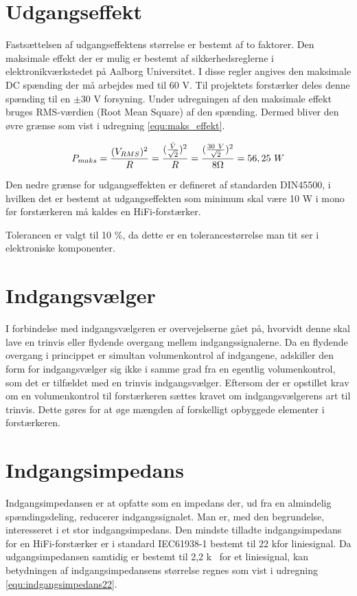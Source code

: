 \section{Udgangseffekt}
\label{krav_udgangseffekt}
Fastsættelsen af udgangseffektens størrelse er bestemt af to faktorer. Den maksimale effekt der er mulig er bestemt af sikkerhedsreglerne i elektronikværkstedet på Aalborg Universitet. I disse regler angives den maksimale DC spænding der må arbejdes med til 60 V. Til projektets forstærker deles denne spænding til en $\pm$30 V forsyning. Under udregningen af den maksimale effekt bruges RMS-værdien (Root Mean Square) af den spænding. Dermed bliver den øvre grænse som vist i udregning \ref{equ:maks_effekt}.

\begin{equation}
\label{equ:maks_effekt}
P_{maks} = \frac{(V_{RMS})^2}{R}= \frac{(\frac{\hat{V}}{\sqrt{2}})^2}{R} = \frac{(\frac{30~V}{\sqrt{2}})^2}{8\ohm} = 56,25~W
\end{equation}

Den nedre grænse for udgangseffekten er defineret af standarden DIN45500, i hvilken det er bestemt at udgangseffekten som minimum skal være 10 W i mono før forstærkeren må kaldes en HiFi-forstærker.

Tolerancen er valgt til 10 \%, da dette er en tolerancestørrelse man tit ser i elektroniske komponenter.

\section{Indgangsvælger}
\label{krav_indgangsvaelger}
I forbindelse med indgangsvælgeren er overvejelserne gået på, hvorvidt denne skal lave en trinvis eller flydende overgang mellem indgangssignalerne. Da en flydende overgang i princippet er simultan volumenkontrol af indgangene, adskiller den form for indgangsvælger sig ikke i samme grad fra en egentlig volumenkontrol, som det er tilfældet med en trinvis indgangsvælger. Eftersom der er opstillet krav om en volumenkontrol til forstærkeren sættes kravet om indgangsvælgerens art til trinvis. Dette gøres for at øge mængden af forskelligt opbyggede elementer i forstærkeren. 

\section{Indgangsimpedans}
\label{krav_indgangsimpedans}
Indgangsimpedansen er at opfatte som en impedans der, ud fra en almindelig spændingsdeling, reducerer indgangssignalet. Man er, med den begrundelse, interesseret i et stor indgangsimpedans. Den mindste tilladte indgangsimpedans for en HiFi-forstærker er i standard IEC61938-1 bestemt til 22 k\ohm for liniesignal. Da udgangsimpedansen samtidig er bestemt til 2,2 k\ohm~ for et liniesignal, kan betydningen af indgangsimpedansens størrelse regnes som vist i udregning \ref{equ:indgangsimpedans22}. 

